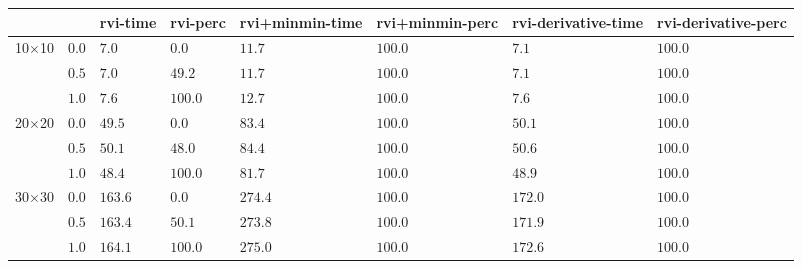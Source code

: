 \begin{tabular}{llllllll}
\toprule
 &  & rvi-time & rvi-perc & rvi+minmin-time & rvi+minmin-perc & rvi-derivative-time & rvi-derivative-perc \\
\midrule
\multirow[t]{3}{*}{10$\times$10} & $0.0$ & $7.0$ & $0.0$ & $11.7$ & $100.0$ & $7.1$ & $100.0$ \\
 & $0.5$ & $7.0$ & $49.2$ & $11.7$ & $100.0$ & $7.1$ & $100.0$ \\
 & $1.0$ & $7.6$ & $100.0$ & $12.7$ & $100.0$ & $7.6$ & $100.0$ \\
\cline{1-8}
\multirow[t]{3}{*}{20$\times$20} & $0.0$ & $49.5$ & $0.0$ & $83.4$ & $100.0$ & $50.1$ & $100.0$ \\
 & $0.5$ & $50.1$ & $48.0$ & $84.4$ & $100.0$ & $50.6$ & $100.0$ \\
 & $1.0$ & $48.4$ & $100.0$ & $81.7$ & $100.0$ & $48.9$ & $100.0$ \\
\cline{1-8}
\multirow[t]{3}{*}{30$\times$30} & $0.0$ & $163.6$ & $0.0$ & $274.4$ & $100.0$ & $172.0$ & $100.0$ \\
 & $0.5$ & $163.4$ & $50.1$ & $273.8$ & $100.0$ & $171.9$ & $100.0$ \\
 & $1.0$ & $164.1$ & $100.0$ & $275.0$ & $100.0$ & $172.6$ & $100.0$ \\
\cline{1-8}
\bottomrule
\end{tabular}
